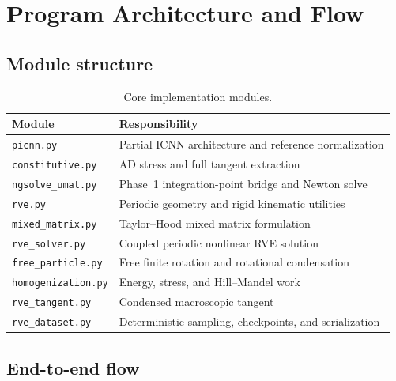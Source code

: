 \chapter{Program Architecture and Flow}
\label{ch:architecture}

\section{Module structure}

\begin{table}[H]
\centering
\caption{Core implementation modules.}
\label{tab:modules}
\begin{tabularx}{\textwidth}{@{}p{}X@{}}
\toprule
Module & Responsibility\\
\midrule
\texttt{picnn.py} & Partial ICNN architecture and reference normalization\\
\texttt{constitutive.py} & AD stress and full tangent extraction\\
\texttt{ngsolve\_umat.py} & Phase~1 integration-point bridge and Newton solve\\
\texttt{rve.py} & Periodic geometry and rigid kinematic utilities\\
\texttt{mixed\_matrix.py} & Taylor--Hood mixed matrix formulation\\
\texttt{rve\_solver.py} & Coupled periodic nonlinear RVE solution\\
\texttt{free\_particle.py} & Free finite rotation and rotational condensation\\
\texttt{homogenization.py} & Energy, stress, and Hill--Mandel work\\
\texttt{rve\_tangent.py} & Condensed macroscopic tangent\\
\texttt{rve\_dataset.py} & Deterministic sampling, checkpoints, and serialization\\
\bottomrule
\end{tabularx}
\end{table}

\section{End-to-end flow}

